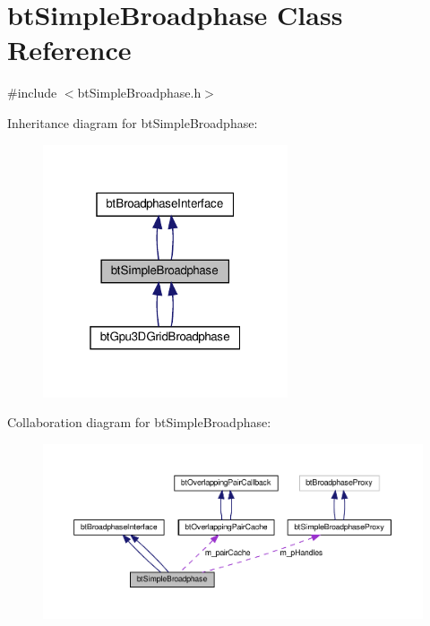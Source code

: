 \hypertarget{classbtSimpleBroadphase}{}\section{bt\+Simple\+Broadphase Class Reference}
\label{classbtSimpleBroadphase}


{\ttfamily \#include $<$bt\+Simple\+Broadphase.\+h$>$}



Inheritance diagram for bt\+Simple\+Broadphase\+:
\nopagebreak
\begin{figure}[H]
\begin{center}
\leavevmode
\includegraphics[width=205pt]{classbtSimpleBroadphase__inherit__graph}
\end{center}
\end{figure}


Collaboration diagram for bt\+Simple\+Broadphase\+:
\nopagebreak
\begin{figure}[H]
\begin{center}
\leavevmode
\includegraphics[width=350pt]{classbtSimpleBroadphase__coll__graph}
\end{center}
\end{figure}

